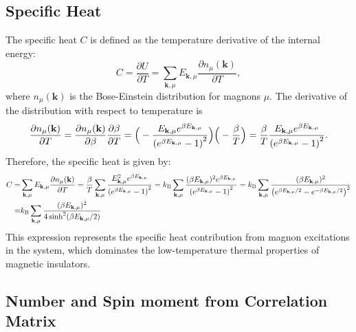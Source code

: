 \documentclass[aps, prx, nofootinbib, superscriptaddress]{revtex4-2}
\newcommand{\kvec}{\mathbf{k}}
\begin{document}
\subsection{Specific Heat}\label{subsec: Specific Heat}
The specific heat $C$ is defined as the temperature derivative of the internal energy:
\begin{equation}
    C = \frac{\partial U}{\partial T} = \sum_{\kvec, \mu} E_{\kvec, \mu} \frac{\partial n_{\mu}(\kvec)}{\partial T},
\end{equation}
where $n_{\mu}(\kvec)$ is the Bose-Einstein distribution for magnons $\mu$. 
The derivative of the distribution with respect to temperature is 
\begin{equation}
    \frac{\partial n_{\mu}(\kvec)}{\partial T} 
    =  \frac{\partial n_{\mu}(\kvec)}{\partial \beta} \frac{\partial \beta}{\partial T} \\
    =  \Big( - \frac{E_{\kvec, \mu} e^{\beta E_{\kvec, \mu}}}{\left( e^{\beta E_{\kvec, \mu}} - 1 \right)^2} \Big) \Big( - \frac{\beta}{T}\Big) 
    =  \frac{\beta}{T} \frac{E_{\kvec, \mu} e^{\beta E_{\kvec, \mu}}}{\left( e^{\beta E_{\kvec, \mu}} - 1 \right)^2}.
\end{equation}
Therefore, the specific heat is given by:
\begin{equation}
    \begin{split}
        C = & \sum_{\kvec, \mu} E_{\kvec, \mu} \frac{\partial n_{\mu}(\kvec)}{\partial T} 
        = \frac{\beta}{T} \sum_{\kvec, \mu} \frac{E_{\kvec, \mu}^2 e^{\beta E_{\kvec, \mu}}}{\left( e^{\beta E_{\kvec, \mu}} - 1 \right)^2}
        = k_{\rm B} \sum_{\kvec, \mu} \frac{(\beta E_{\kvec, \mu})^2 e^{\beta E_{\kvec, \mu}}}{\left( e^{\beta E_{\kvec, \mu}} - 1 \right)^2}
        =  k_{\rm B} \sum_{\kvec, \mu} \frac{ (\beta E_{\kvec, \mu})^2 }{\left( e^{\beta E_{\kvec, \mu}/2} - e^{-\beta E_{\kvec, \mu}/2} \right)^2} \\
        = &  k_{\rm B} \sum_{\kvec, \mu} \frac{ (\beta E_{\kvec, \mu})^2 }{4 \sinh^{2} (\beta E_{\kvec, \mu}/2 )}
    \end{split}
\end{equation}
This expression represents the specific heat contribution from magnon excitations in the system, which dominates the low-temperature thermal properties of magnetic insulators.



\subsection{Number and Spin moment from Correlation Matrix}\label{subsec: Number expectation value/Spin moment}
\end{document}
